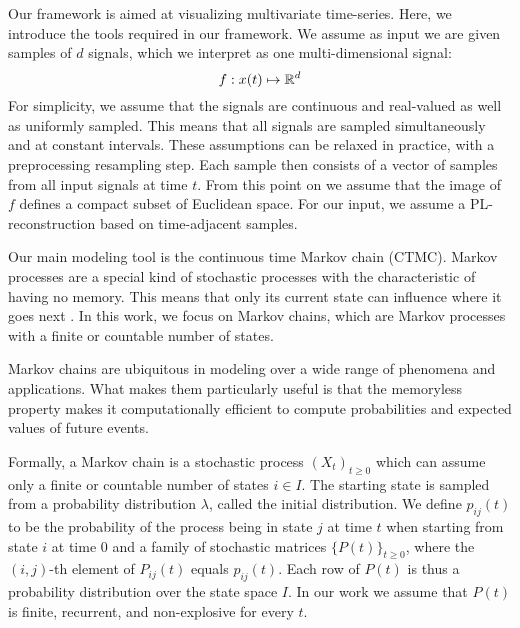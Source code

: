 \label{sec:preliminaries}
Our framework is aimed at visualizing multivariate time-series. Here, we introduce the tools required in our framework. We assume as input we are given samples of $d$ signals, which we interpret as one multi-dimensional signal:
$$f: x(t)\mapsto \mathbb{R}^d$$
For simplicity, we assume that the signals are continuous and real-valued as well as uniformly sampled. This means that all signals are sampled simultaneously and at constant intervals. These assumptions can be relaxed in practice, with a preprocessing resampling step.  Each sample then consists of a vector of samples from all input signals at time $t$. 
From this point on we  assume that the image of $f$ defines a compact subset of Euclidean space. For our input, we assume a PL-reconstruction based on time-adjacent samples. 




Our main modeling tool is the continuous time Markov chain (CTMC). Markov processes are a special kind of stochastic processes with the characteristic of having no memory. This means that only its current state can influence where it goes next \cite{norris1998markov}. In this work, we focus on Markov chains, which are Markov processes with a finite or countable number of states.

Markov chains are ubiquitous in modeling over a wide range of phenomena and applications. What makes them particularly useful is that the memoryless property makes it computationally efficient to compute probabilities and expected values of future events.

Formally, a Markov chain is a stochastic process $(X_t)_{t \ge 0}$ which can assume 
only a finite or countable number of states $i \in I$. The starting state
is sampled from a probability distribution $\lambda$, called the initial distribution.
We define $p_{ij}(t)$ to be the probability of the process being in state $j$ at time $t$
when starting from state $i$ at time $0$ and a family of stochastic matrices $\{P(t)\}_{t \ge 0}$,
where the $(i,j)$-th element of $P_{ij}(t)$ equals $p_{ij}(t)$.
Each row of $P(t)$ is thus a probability distribution over the state space $I$. In our
work we assume that $P(t)$ is finite, recurrent, and non-explosive for every $t$. %

